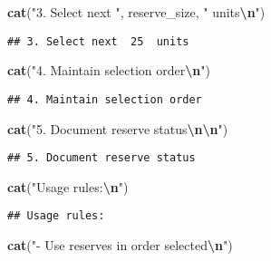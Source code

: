 \documentclass[
]{article}
\newenvironment{Shaded}{\begin{snugshade}}{\end{snugshade}}
\newcommand{\FunctionTok}[1]{\textcolor[rgb]{0.13,0.29,0.53}{\textbf{#1}}}
\newcommand{\NormalTok}[1]{#1}
\newcommand{\SpecialCharTok}[1]{\textcolor[rgb]{0.81,0.36,0.00}{\textbf{#1}}}
\newcommand{\StringTok}[1]{\textcolor[rgb]{0.31,0.60,0.02}{#1}}
\begin{document}
\begin{Shaded}
\begin{Highlighting}[]
\FunctionTok{cat}\NormalTok{(}\StringTok{"3. Select next "}\NormalTok{, reserve\_size, }\StringTok{" units}\SpecialCharTok{\textbackslash{}n}\StringTok{"}\NormalTok{)}
\end{Highlighting}
\end{Shaded}

\begin{verbatim}
## 3. Select next  25  units
\end{verbatim}

\begin{Shaded}
\begin{Highlighting}[]
\FunctionTok{cat}\NormalTok{(}\StringTok{"4. Maintain selection order}\SpecialCharTok{\textbackslash{}n}\StringTok{"}\NormalTok{)}
\end{Highlighting}
\end{Shaded}

\begin{verbatim}
## 4. Maintain selection order
\end{verbatim}

\begin{Shaded}
\begin{Highlighting}[]
\FunctionTok{cat}\NormalTok{(}\StringTok{"5. Document reserve status}\SpecialCharTok{\textbackslash{}n\textbackslash{}n}\StringTok{"}\NormalTok{)}
\end{Highlighting}
\end{Shaded}

\begin{verbatim}
## 5. Document reserve status
\end{verbatim}

\begin{Shaded}
\begin{Highlighting}[]
\FunctionTok{cat}\NormalTok{(}\StringTok{"Usage rules:}\SpecialCharTok{\textbackslash{}n}\StringTok{"}\NormalTok{)}
\end{Highlighting}
\end{Shaded}

\begin{verbatim}
## Usage rules:
\end{verbatim}

\begin{Shaded}
\begin{Highlighting}[]
\FunctionTok{cat}\NormalTok{(}\StringTok{"{-} Use reserves in order selected}\SpecialCharTok{\textbackslash{}n}\StringTok{"}\NormalTok{)}
\end{Highlighting}
\end{Shaded}
\end{document}
